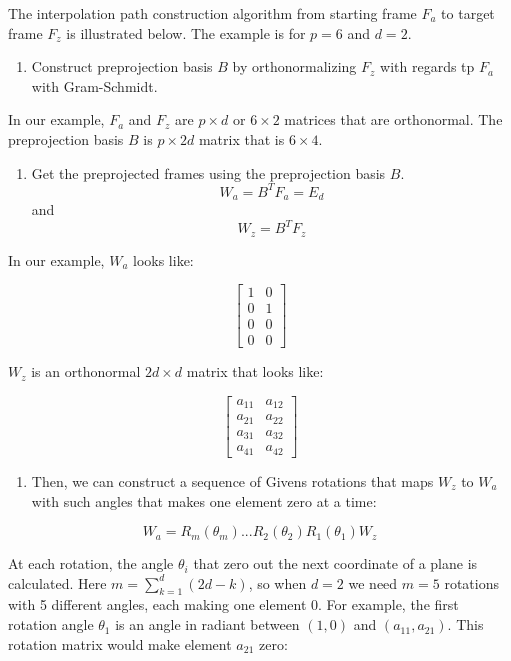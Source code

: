 The interpolation path construction algorithm from starting frame \(F_a\) to target frame \(F_z\) is illustrated below. The example is for \(p=6\) and \(d=2\).

\begin{enumerate}
\def\labelenumi{\arabic{enumi}.}
\tightlist
\item
  Construct preprojection basis \(B\) by orthonormalizing \(F_z\) with regards tp \(F_a\) with Gram-Schmidt.
\end{enumerate}

In our example, \(F_a\) and \(F_z\) are \(p\times d\) or \(6\times2\) matrices that are orthonormal. The preprojection basis \(B\) is \(p\times 2d\) matrix that is \(6\times 4\).

\begin{enumerate}
\def\labelenumi{\arabic{enumi}.}
\setcounter{enumi}{1}
\tightlist
\item
  Get the preprojected frames using the preprojection basis \(B\).
  \[W_a = B^TF_a = E_d\] and \[W_z = B^TF_z\]
\end{enumerate}

In our example, \(W_a\) looks like:

\[ \begin{bmatrix}1 & 0 \\0  &1 \\ 0&0 \\0&0\end{bmatrix} \]

\(W_z\) is an orthonormal \(2d\times d\) matrix that looks like:

\[ \begin{bmatrix} a_{11} & a_{12} \\a_{21}  &a_{22} \\ a_{31}&a_{32} \\a_{41}&a_{42}\end{bmatrix} \]

\begin{enumerate}
\def\labelenumi{\arabic{enumi}.}
\setcounter{enumi}{2}
\tightlist
\item
  Then, we can construct a sequence of Givens rotations that maps \(W_z\) to \(W_a\) with such angles that makes one element zero at a time:
\end{enumerate}

\[ W_a = R_m(\theta_m) ... R_2(\theta_2)R_1(\theta_1)W_z\]

At each rotation, the angle \(\theta_i\) that zero out the next coordinate of a plane is calculated. Here \(m = \sum_{k=1}^d (2d - k)\), so when \(d=2\) we need \(m=5\) rotations with 5 different angles, each making one element 0. For example, the first rotation angle \(\theta_1\) is an angle in radiant between \((1, 0)\) and \((a_{11}, a_{21})\). This rotation matrix would make element \(a_{21}\) zero:

